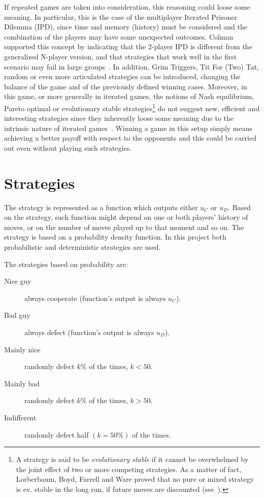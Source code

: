 \documentclass[journal,10pt,twoside]{IEEEtran}
\begin{document}
If repeated games are taken into consideration, this reasoning could loose some meaning. In particular, this is the case of the multiplayer Iterated Prisoner Dilemma (IPD), since time and memory (history) must be considered and the combination of the players may have some unexpected outcomes.
Colman supported this concept by indicating that the 2-player IPD is different from the generalized N-player version, and that strategies that work well in the first scenario may fail in large groups~\cite[p.142]{colman2016game,yao1994experimental}.
In addition, Grim Triggers, Tit For (Two) Tat, random or even more articulated strategies can be introduced, changing the balance of the game and of the previously defined winning cases.
Moreover, in this game, or more generally in iterated games, the notions of Nash equilibrium, Pareto optimal or evolutionary stable strategies\footnote{A strategy is said to be \textit{evolutionary stable} if it cannot be overwhelmed by the joint effect of two or more competing strategies. As a matter of fact, Lorberbaum, Boyd, Farrell and Ware proved that no pure or mixed strategy is ev. stable in the long run, if future moves are discounted (see~\cite{lorb94}).} do not suggest new, efficient and interesting strategies since they inherently loose some meaning due to the intrinsic nature of iterated games~\cite{mathieu2017}.
Winning a game in this setup simply means achieving a better payoff with respect to the opponents and this could be carried out even without playing such strategies.

\section{Strategies} \label{s:str}
The strategy is represented as a function which outputs either $u_C$ or $u_D$. Based on the strategy, such function might depend on one or both players' history of moves, or on the number of moves played up to that moment and so on.
The strategy is based on a probability density function. In this project both probabilistic and deterministic strategies are used.

The strategies based on probability are:
\begin{description}
    \item[Nice guy] always cooperate (function's output is always $u_C$).
    \item[Bad guy] always defect (function's output is always $u_D$).
    \item[Mainly nice] randomly defect $k\%$ of the times, $k<50$.
    \item[Mainly bad] randomly defect $k\%$ of the times, $k>50$.
    \item[Indifferent] randomly defect half $(k=50\%)$ of the times.
\end{description}
\end{document}

